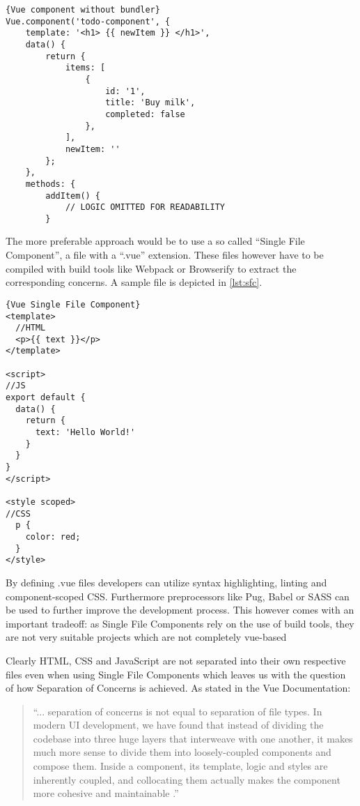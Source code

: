 \begin{lstlisting}[caption=Vue component without bundler, captionpos=b, style=htmlcssjs]{Vue component without bundler}
Vue.component('todo-component', {
    template: '<h1> {{ newItem }} </h1>',
    data() {
        return {
            items: [
                {
                    id: '1',
                    title: 'Buy milk',
                    completed: false
                },
            ],
            newItem: ''
        };
    },
    methods: {
        addItem() {
            // LOGIC OMITTED FOR READABILITY
        }
\end{lstlisting}
The more preferable approach would be to use a so called “Single File Component”, a file with a “.vue” extension. These files however have to be compiled with build tools like Webpack or Browserify to extract the corresponding concerns. A sample file is depicted in \autoref{lst:sfc}.

\begin{lstlisting}[caption=Vue Single File Component, label={lst:sfc}, captionpos=b, style=htmlcssjs]{Vue Single File Component}
<template>
  //HTML
  <p>{{ text }}</p>
</template>

<script>
//JS
export default {
  data() {
    return {
      text: 'Hello World!'
    }
  }
}
</script>

<style scoped>
//CSS
  p {
    color: red;
  }
</style>
\end{lstlisting}

By defining .vue files developers can utilize syntax highlighting, linting and component-scoped CSS. Furthermore preprocessors like Pug, Babel or SASS can be used to further improve the development process. This however comes with an important tradeoff: as Single File Components rely on the use of build tools, they are not very suitable projects which are not completely vue-based

Clearly HTML, CSS and JavaScript are not separated into their own respective files even when using Single File Components which leaves us with the question of how Separation of Concerns is achieved. As stated in the Vue Documentation: 

\begin{quotation}
“... separation of concerns is not equal to separation of file types. In modern UI development, we have found that instead of dividing the codebase into three huge layers that interweave with one another, it makes much more sense to divide them into loosely-coupled components and compose them. Inside a component, its template, logic and styles are inherently coupled, and collocating them actually makes the component more cohesive and maintainable \cite{VueSeparationofConcerns:online}.” 
\end{quotation}

